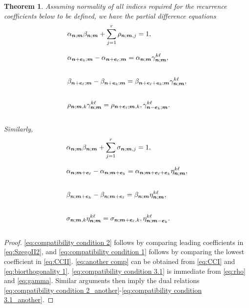 \documentclass[reqno,centertags,11pt,draft]{amsart}
\newtheorem{thm}{Theorem}[section]
\newcommand{\Z}{\mathbb{Z}}
\newcommand{\N}{\mathbb{N}}
\begin{document}
\begin{thm}
Assuming normality of all indices required for the recurrence coefficients below to be defined, we have the partial difference equations
     \begin{align} 
    \label{eq:compatibility condition 2}
    & \alpha_{\bm{n};\bm{m}}\beta_{\bm{n};\bm{m}} + \sum_{j = 1}^r \rho_{\bm{n};\bm{m},j} = 1,
    \\
    \label{eq:compatibility condition 1}
    & 
    \vphantom{\sum_{j = 1}^r }
    \alpha_{\bm{n}+\bm{e}_k;\bm{m}} - \alpha_{\bm{n}+\bm{e}_\ell;\bm{m}}
    = \alpha_{\bm{n};\bm{m}} \gamma_{\bm{n};\bm{m}}^{k\ell},
    \\
    \label{eq:another comp}
    \vphantom{\sum_{j = 1}^r }
    &\beta_{\bm{n}+\bm{e}_\ell;\bm{m}} - \beta_{\bm{n}+\bm{e}_k;\bm{m}}
    = \beta_{\bm{n}+\bm{e}_\ell+\bm{e}_k;\bm{m}} \gamma_{\bm{n};\bm{m}}^{k\ell},
    \\
    \vphantom{\sum_{j = 1}^r }
    \label{eq:compatibility condition 3.1}
    & \rho_{\bm{n};\bm{m},k} \gamma_{\bm{n};\bm{m}}^{k\ell}= \rho_{\bm{n}+\bm{e}_\ell;\bm{m},k}, \gamma_{\bm{n}-\bm{e}_k;\bm{m}}^{k\ell} .
    \end{align}


Similarly,
    \begin{align} 
    \label{eq:compatibility condition 2_another}
    & \alpha_{\bm{n};\bm{m}}\beta_{\bm{n};\bm{m}} + \sum_{j = 1}^r \sigma_{\bm{n};\bm{m},j} = 1,
    \\
    \label{eq:compatibility condition 1_another}
    & 
    \vphantom{\sum_{j = 1}^r }
    \alpha_{\bm{n};\bm{m}+\bm{e}_\ell} - \alpha_{\bm{n};\bm{m}+\bm{e}_k}
    = \alpha_{\bm{n};\bm{m}+\bm{e}_\ell+\bm{e}_k} \eta_{\bm{n};\bm{m}}^{k\ell},
    \\
    \vphantom{\sum_{j = 1}^r }
    &\beta_{\bm{n};\bm{m}+\bm{e}_k} - \beta_{\bm{n};\bm{m}+\bm{e}_\ell}
    = \beta_{\bm{n};\bm{m}} \eta_{\bm{n};\bm{m}}^{k\ell},
    \\
    \vphantom{\sum_{j = 1}^r }
    \label{eq:compatibility condition 3.1_another}
    & \sigma_{\bm{n};\bm{m},k} \eta_{\bm{n};\bm{m}}^{k\ell}= \sigma_{\bm{n};\bm{m}+\bm{e}_\ell,k}, \eta_{\bm{n};\bm{m}-\bm{e}_k}^{k\ell} .
    \end{align}
\end{thm}

\begin{proof}
    \eqref{eq:compatibility condition 2} follows by comparing leading coefficients in \eqref{eq:SzegoII2}, and \eqref{eq:compatibility condition 1} follows by comparing the lowest coefficient in \eqref{eq:CCII}. \eqref{eq:another comp} can be obtained from \eqref{eq:CCI} and \eqref{eq:biorthogonality 1}. \eqref{eq:compatibility condition 3.1} is immediate from \eqref{eq:rho} and \eqref{eq:gamma}. Similar arguments then imply the dual relations \eqref{eq:compatibility condition 2_another}-\eqref{eq:compatibility condition 3.1_another}.
\end{proof}
\end{document}
